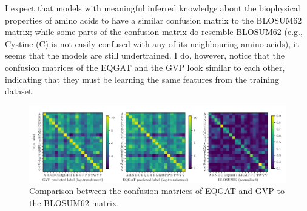 I expect that models with meaningful inferred knowledge about the biophysical properties of amino acids to have a similar confusion matrix to the BLOSUM62 matrix; while some parts of the confusion matrix do resemble BLOSUM62 (e.g., Cystine (C) is not easily confused with any of its neighbouring amino acids), it seems that the models are still undertrained. I do, however, notice that the confusion matrices of the EQGAT and the GVP look similar to each other, indicating that they must be learning the same features from the training dataset.  

\begin{figure}
    \centering
    \includegraphics[width=\textwidth]{masters-report/figures/confusion_matrices.pdf}
    \caption{Comparison between the confusion matrices of EQGAT and GVP to the BLOSUM62 matrix.}
    \label{fig:confusions}
\end{figure}






